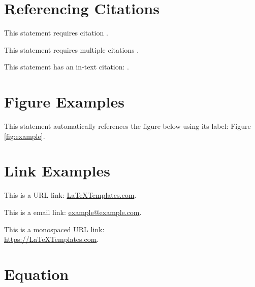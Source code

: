 \documentclass[a4paper]{CSMakotoTechnicalReport}
\begin{document}
\begin{multicols}{2}

    \section{Referencing Citations}

    This statement requires citation \autocite{Smith:2024jd}.

    This statement requires multiple citations \autocite{Smith:2024jd, Smith:2023qr}.

    This statement has an in-text citation: \textcite{Smith:2024jd}.


    \section{Figure Examples}

    This statement automatically references the figure below using its label: Figure \ref{fig:example}.


    \section{Link Examples}

    This is a URL link: \href{https://www.LaTeXTemplates.com}{LaTeXTemplates.com}.

    This is a email link: \href{mailto:example@example.com}{example@example.com}.

    This is a monospaced URL link:\\ \url{https://LaTeXTemplates.com}.


    \section{Equation}


\end{multicols}
\end{document}
